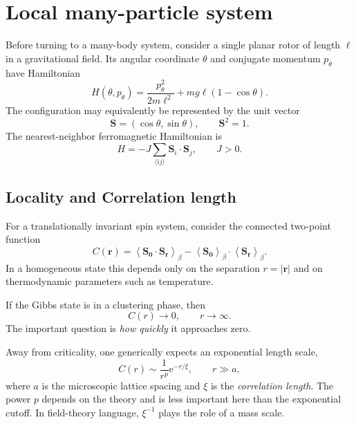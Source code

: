 \documentclass[11pt]{article}
\newcommand{\e}{\mathrm{e}}
\newcommand{\avg}[1]{\left\langle #1\right\rangle_\beta}
\begin{document}
\section{Local many-particle system}

Before turning to a many-body system, consider a single planar rotor of length $\ell$ in a gravitational field.  Its angular coordinate $\theta$ and conjugate momentum $p_\theta$ have Hamiltonian
\begin{equation}
  H(\theta,p_\theta)
  =\frac{p_\theta^2}{2m\ell^2}+mg\ell(1-\cos\theta).
  \label{eq:single-rotor}
\end{equation}
The configuration may equivalently be represented by the unit vector
\begin{equation}
  \bm S=(\cos\theta,\sin\theta),
  \qquad \bm S^2=1.
\end{equation}
The nearest-neighbor ferromagnetic Hamiltonian is
\begin{equation}
  H=-J\sum_{\langle ij\rangle}\bm S_i\cdot\bm S_j,
  \qquad J>0.
  \label{eq:ONH}
\end{equation}


\subsection{Locality and Correlation length}

For a translationally invariant spin system, consider the connected two-point function
\begin{equation}
  C(\bm r)
  =\avg{\bm S_{\bm 0}\cdot\bm S_{\bm r}}
   -\avg{\bm S_{\bm 0}}\cdot\avg{\bm S_{\bm r}}.
  \label{eq:spinC}
\end{equation}
In a homogeneous state this depends only on the separation $r=|\bm r|$ and on thermodynamic parameters such as temperature.

If the Gibbs state is in a clustering phase, then
\begin{equation}
  C(r)\longrightarrow 0,
  \qquad r\longrightarrow\infty.
  \label{eq:cluster}
\end{equation}
The important question is \emph{how quickly} it approaches zero.

Away from criticality, one generically expects an exponential length scale,
\begin{equation}
  C(r)\sim \frac{1}{r^{p}}\e^{-r/\xi},
  \qquad r\gg a,
  \label{eq:massivecorr}
\end{equation}
where $a$ is the microscopic lattice spacing and $\xi$ is the \emph{correlation length}.  The power $p$ depends on the theory and is less important here than the exponential cutoff.  In field-theory language, $\xi^{-1}$ plays the role of a mass scale.
\end{document}
